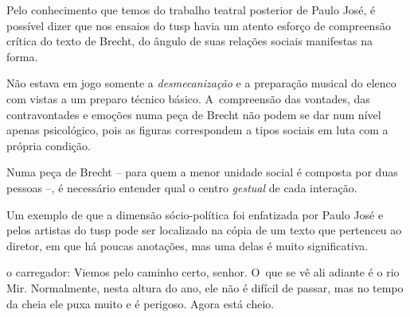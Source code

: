 \subject{Análise social do texto}

Pelo conhecimento que temos do trabalho teatral posterior de Paulo José,
é possível dizer que nos ensaios do {\sc tusp} havia um atento esforço de
compreensão crítica do texto de Brecht, do ângulo de suas relações
sociais manifestas na forma.

Não estava em jogo somente a {\it desmecanização} e a preparação musical
do elenco com vistas a um preparo técnico básico. A~compreensão das
vontades, das contravontades e emoções numa peça de Brecht não podem se
dar num nível apenas psicológico, pois as figuras correspondem a tipos
sociais em luta com a própria condição.

Numa peça de Brecht -- para quem a menor unidade social é composta por
duas pessoas --, é necessário entender qual o centro {\it gestual} de cada
interação.

Um exemplo de que a dimensão sócio-política foi enfatizada por Paulo
José e pelos artistas do {\sc tusp} pode ser localizado na cópia de um texto
que pertenceu ao diretor, em que há poucas anotações, mas uma delas é
muito significativa.


\startblockquote
{\sc o carregador}: Viemos pelo caminho certo, senhor. O~que se vê ali adiante
é o rio Mir. Normalmente, nesta altura do ano, ele não é difícil de
passar, mas no tempo da cheia ele puxa muito e é perigoso. Agora está
cheio.

